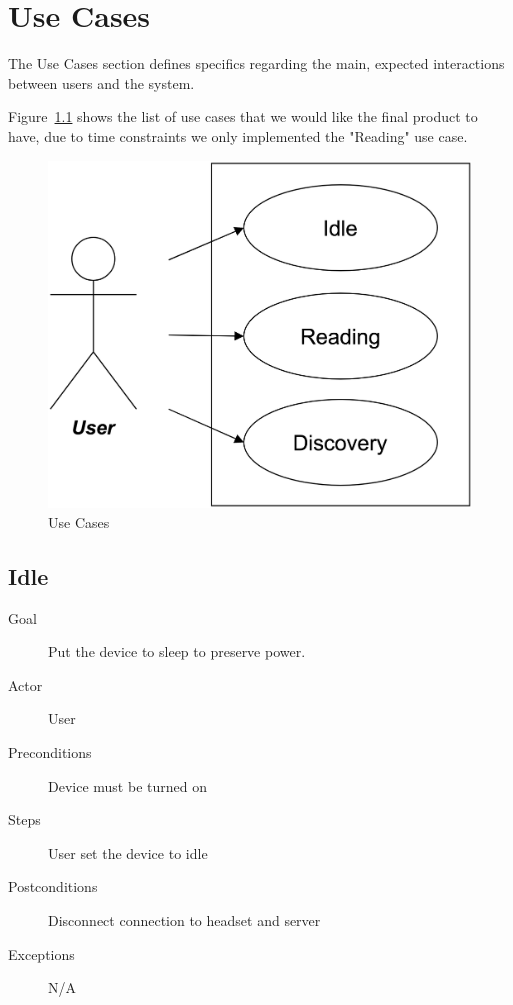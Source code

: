 \chapter{Use Cases}
The Use Cases section defines specifics regarding the main, expected interactions between users and the system.

Figure~\ref{useCase} shows the list of use cases that we would like the final product to have, due to time constraints we only implemented the "Reading" use case.

\begin{figure}
	
	\centering
	\includegraphics[scale = 0.15]{useCase.png}
    
    \caption{Use Cases}
    \label{useCase}
\end{figure}

\pagebreak

\section{Idle}
\begin{description}
\item [Goal] Put the device to sleep to preserve power.
\item [Actor] User
\item [Preconditions] Device must be turned on
\item [Steps] User set the device to idle
\item [Postconditions] Disconnect connection to headset and server
\item [Exceptions] N/A
\end{description}


